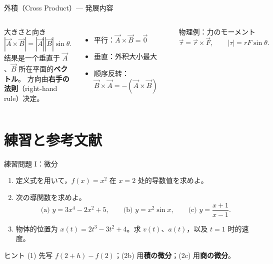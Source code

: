 \documentclass[notheorems,aspectratio=169]{beamer}
\newcommand{\jp}[1]{\textbf{\color{JapanBlue}#1}}
\newcommand{\key}[1]{\textbf{\color{ChinaRed}#1}}
\begin{document}
\begin{frame}{外積（Cross Product）— 発展内容}
  \begin{columns}[T,onlytextwidth]
    \begin{block}{大きさと向き}
      \[
        |\vec A\times\vec B|
        =|\vec A||\vec B|\sin\theta.
      \]
      结果是一个垂直于 $\vec A$、$\vec B$ 所在平面的\key{ベクトル}。
      方向由\jp{右手の法則}（right-hand rule）决定。
    \end{block}
    \begin{itemize}
      \item 平行：$\vec A\times\vec B=\vec0$
      \item 垂直：外积大小最大
      \item 顺序反转：$\vec B\times\vec A=-(\vec A\times\vec B)$
    \end{itemize}

    \begin{center}
    \end{center}
    \begin{alertblock}{物理例：力のモーメント}
      \[
        \vec\tau=\vec r\times\vec F,
        \qquad |\tau|=rF\sin\theta.
      \]
    \end{alertblock}
  \end{columns}
\end{frame}

\section{練習と参考文献}

\begin{frame}{練習問題 I：微分}
  \begin{enumerate}
    \item 定义式を用いて，$f(x)=x^2$ 在 $x=2$ 处的导数值を求めよ。
    \vspace{0.45em}
    \item 次の導関数を求めよ。
      \[
        \text{(a) }y=3x^4-2x^2+5,
        \qquad
        \text{(b) }y=x^2\sin x,
        \qquad
        \text{(c) }y=\frac{x+1}{x-1}.
      \]
    \item 物体的位置为 $x(t)=2t^3-3t^2+4$。求 $v(t)$、$a(t)$，以及 $t=1$ 时的速度。
  \end{enumerate}

  \begin{alertblock}{ヒント}
    (1) 先写 $f(2+h)-f(2)$；(2b) 用\jp{積の微分}；(2c) 用\jp{商の微分}。
  \end{alertblock}
\end{frame}
\end{document}
